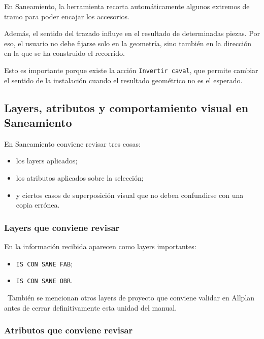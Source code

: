 En Saneamiento, la herramienta recorta automáticamente algunos extremos de tramo para poder encajar los accesorios.

Además, el sentido del trazado influye en el resultado de determinadas piezas. Por eso, el usuario no debe fijarse solo en la geometría, sino también en la dirección en la que se ha construido el recorrido.

Esto es importante porque existe la acción \texttt{Invertir caval}, que permite cambiar el sentido de la instalación cuando el resultado geométrico no es el esperado.


\subsection{Layers, atributos y comportamiento visual en Saneamiento}

En Saneamiento conviene revisar tres cosas:

\begin{itemize}
\item los layers aplicados;
\item los atributos aplicados sobre la selección;
\item y ciertos casos de superposición visual que no deben confundirse con una copia errónea.
\end{itemize}

\subsubsection{Layers que conviene revisar}

En la información recibida aparecen como layers importantes:

\begin{itemize}
\item \texttt{IS CON SANE FAB};
\item \texttt{IS CON SANE OBR}.
\end{itemize}

\pendingtag\ También se mencionan otros layers de proyecto que conviene validar en Allplan antes de cerrar definitivamente esta unidad del manual.


\subsubsection{Atributos que conviene revisar}

